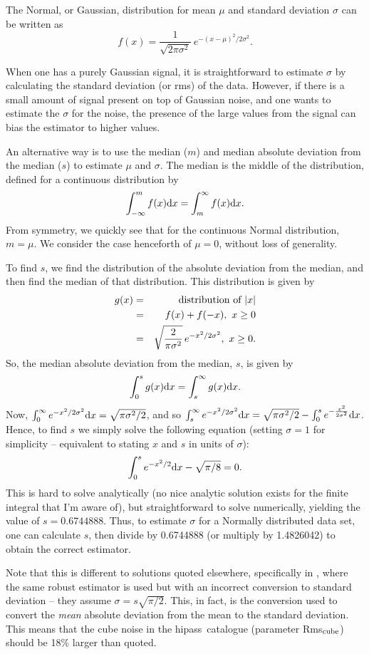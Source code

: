 \documentclass[12pt,a4paper]{article}
\newcommand{\hipass}{{\sc hipass}}
\newcommand{\diff}{{\rm d}}
\begin{document}
The Normal, or Gaussian, distribution for mean $\mu$ and standard
deviation $\sigma$ can be written as 
\[ 
f(x) = \frac{1}{\sqrt{2\pi\sigma^2}}\ e^{-(x-\mu)^2/2\sigma^2}.
 \]

When one has a purely Gaussian signal, it is straightforward to
estimate $\sigma$ by calculating the standard deviation (or rms) of
the data. However, if there is a small amount of signal present on top
of Gaussian noise, and one wants to estimate the $\sigma$ for the
noise, the presence of the large values from the signal can bias the
estimator to higher values.

An alternative way is to use the median ($m$) and median absolute deviation
from the median ($s$) to estimate $\mu$ and $\sigma$. The median is the
middle of the distribution, defined for a continuous distribution by
\[
\int_{-\infty}^{m} f(x) \diff x = \int_{m}^{\infty} f(x) \diff x.
\]
From symmetry, we quickly see that for the continuous Normal
distribution, $m=\mu$. We consider the case henceforth of $\mu=0$,
without loss of generality.

To find $s$, we find the distribution of the absolute deviation from
the median, and then find the median of that distribution. This
distribution is given by
\begin{eqnarray*}
g(x) &= &{\mbox{\rm distribution of }} |x|\\
     &= &f(x) + f(-x),\ x\ge0\\
     &= &\sqrt{\frac{2}{\pi\sigma^2}}\, e^{-x^2/2\sigma^2},\ x\ge0.
\end{eqnarray*}
So, the median absolute deviation from the median, $s$, is given by
\[
\int_{0}^{s} g(x) \diff x = \int_{s}^{\infty} g(x) \diff x.
\]
Now, $\int_{0}^{\infty}e^{-x^2/2\sigma^2} \diff x = \sqrt{\pi\sigma^2/2}$, and
so $\int_{s}^{\infty} e^{-x^2/2\sigma^2} \diff x =
\sqrt{\pi\sigma^2/2} - \int_{0}^{s} e^{-\frac{x^2}{2\sigma^2}} \diff x
$. Hence, to find $s$ we simply solve the following equation (setting $\sigma=1$ for
simplicity -- equivalent to stating $x$ and $s$ in units of $\sigma$):
\[
\int_{0}^{s}e^{-x^2/2} \diff x - \sqrt{\pi/8} = 0.
\]
This is hard to solve analytically (no nice analytic solution exists
for the finite integral that I'm aware of), but straightforward to
solve numerically, yielding the value of $s=0.6744888$. Thus, to
estimate $\sigma$ for a Normally distributed data set, one can calculate
$s$, then divide by 0.6744888 (or multiply by 1.4826042) to obtain the
correct estimator.

Note that this is different to solutions quoted elsewhere,
specifically in \citet{meyer04:trunc}, where the same robust estimator
is used but with an incorrect conversion to standard deviation -- they
assume $\sigma = s\sqrt{\pi/2}$. This, in fact, is the conversion used
to convert the {\it mean} absolute deviation from the mean to the
standard deviation. This means that the cube noise in the \hipass\
catalogue (parameter Rms$_{\rm cube}$) should be 18\% larger than
quoted.
\end{document}
